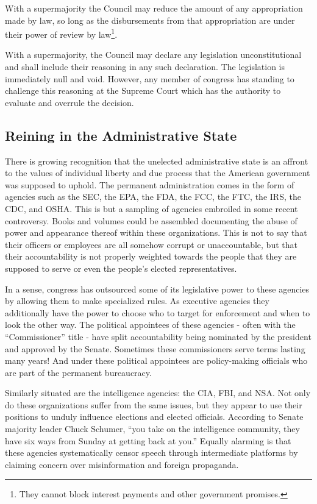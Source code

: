 \documentclass{article}
\newcommand{\quotes}[1]{``#1''}
\begin{document}
\begin{quoting}
With a supermajority the Council may reduce the amount of any appropriation made by law, so long as the disbursements from that appropriation are under their power of review by law\footnote{They cannot block interest payments and other government promises.}.

With a supermajority, the Council may declare any legislation unconstitutional and shall include their reasoning in any such declaration. The legislation is immediately null and void. However, any member of congress has standing to challenge this reasoning at the Supreme Court which has the authority to evaluate and overrule the decision.
\end{quoting}

\subsection{Reining in the Administrative State}

There is growing recognition that the unelected administrative state is an affront to the values of individual liberty and due process that the American government was supposed to uphold. The permanent administration comes in the form of agencies such as the SEC, the EPA, the FDA, the FCC, the FTC, the IRS, the CDC, and OSHA. This is but a sampling of agencies embroiled in some recent controversy. Books and volumes could be assembled documenting the abuse of power and appearance thereof within these organizations. This is not to say that their officers or employees are all somehow corrupt or unaccountable, but that their accountability is not properly weighted towards the people that they are supposed to serve or even the people's elected representatives.

In a sense, congress has outsourced some of its legislative power to these agencies by allowing them to make specialized rules. As executive agencies they additionally have the power to choose who to target for enforcement and when to look the other way. The political appointees of these agencies - often with the \quotes{Commissioner} title - have split accountability being nominated by the president and approved by the Senate. Sometimes these commissioners serve terms lasting many years! And under these political appointees are policy-making officials who are part of the permanent bureaucracy.

Similarly situated are the intelligence agencies: the CIA, FBI, and NSA. Not only do these organizations suffer from the same issues, but they appear to use their positions to unduly influence elections and elected officials. According to Senate majority leader Chuck Schumer\cite{Stanley}, \quotes{you take on the intelligence community, they have six ways from Sunday at getting back at you.} Equally alarming is that these agencies systematically censor speech through intermediate platforms by claiming concern over misinformation and foreign propaganda\cite{Beanz}.
\end{document}
